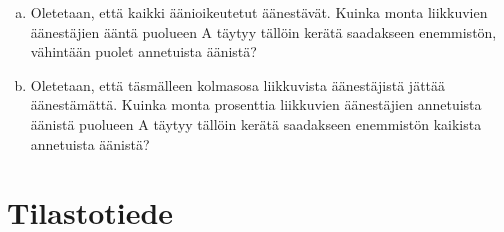 \begin{description}
	\begin{enumerate}[(a)]
		\item Oletetaan, että kaikki äänioikeutetut äänestävät. Kuinka monta liikkuvien äänestäjien ääntä puolueen A täytyy tällöin kerätä saadakseen enemmistön, vähintään puolet annetuista äänistä?
		\item Oletetaan, että täsmälleen kolmasosa liikkuvista äänestäjistä jättää äänestämättä. Kuinka monta prosenttia liikkuvien äänestäjien annetuista äänistä puolueen A täytyy tällöin kerätä saadakseen enemmistön kaikista annetuista äänistä?
	\end{enumerate}	 	
	
\end{description}


\section{Tilastotiede}



